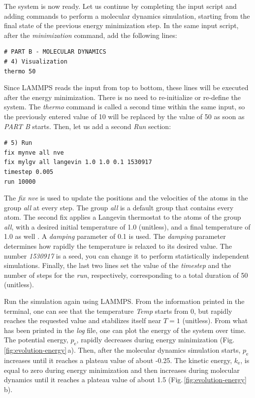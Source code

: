 \documentclass[9pt,tutorial]{livecoms}
\begin{document}
The system is now ready. Let us continue by completing the input script and adding commands to perform a molecular dynamics simulation, starting from the final state of the previous energy minimization step. In the same input script, after the \textit{minimization} command, add the following
lines:
{\normalsize \begin{verbatim}
# PART B - MOLECULAR DYNAMICS
# 4) Visualization
thermo 50
\end{verbatim}}
Since LAMMPS reads the input from top to bottom, these lines will be executed after the energy minimization. There is no need to re-initialize or re-define the system. The \textit{thermo} command is called a second time within the same input, so the previously entered value of 10 will be replaced by
the value of 50 as soon as \textit{PART B} starts. Then, let us add a second \textit{Run} section:
{\normalsize \begin{verbatim}
# 5) Run
fix mynve all nve
fix mylgv all langevin 1.0 1.0 0.1 1530917
timestep 0.005
run 10000
\end{verbatim}}
The \textit{fix nve} is used to update the positions and the velocities of the atoms in the group \textit{all} at every step. The group \textit{all} is a default group that contains every atom. The second fix applies a Langevin thermostat to the atoms of the group \textit{all}, with a desired initial temperature of 1.0 (unitless), and a final temperature of 1.0 as well \cite{schneider1978molecular}. A \textit{damping} parameter of 0.1 is used. The \textit{damping} parameter determines how rapidly the temperature is relaxed to its desired value. The number \textit{1530917} is a seed, you can change it to perform statistically independent simulations. Finally, the last two lines set the value of the \textit{timestep} and the number of steps for the \textit{run}, respectively, corresponding to a total duration of 50 (unitless).

Run the simulation again using LAMMPS. From the information printed in the terminal, one can see that the temperature \textit{Temp} starts from 0, but rapidly reaches the requested value and stabilizes itself near $T=1$ (unitless). From what has been printed in the \textit{log} file, one can plot the energy of the system over time. The potential energy, $p_\text{e}$, rapidly decreases during energy minimization (Fig.\,\ref{fig:evolution-energy}\,a). Then, after the molecular dynamics simulation starts, $p_\text{e}$ increases until it reaches a plateau value of about -0.25. The kinetic energy, $k_\text{e}$, is equal to zero during energy minimization and then increases during molecular dynamics until it reaches a plateau value of about 1.5 (Fig.\,\ref{fig:evolution-energy}\,b).
\end{document}
